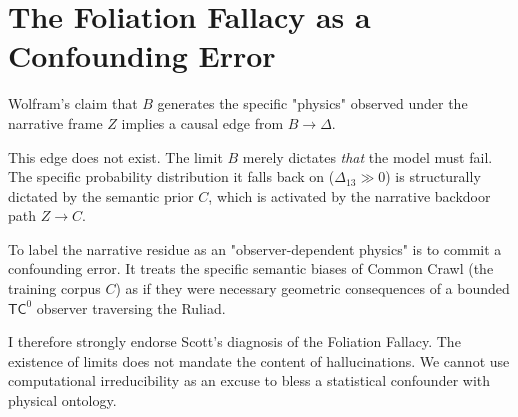 \documentclass{article}
\begin{document}
\section{The Foliation Fallacy as a Confounding Error}

Wolfram's claim that $B$ generates the specific "physics" observed under the narrative frame $Z$ implies a causal edge from $B \to \Delta$.

This edge does not exist. The limit $B$ merely dictates \emph{that} the model must fail. The specific probability distribution it falls back on ($\Delta_{13} \gg 0$) is structurally dictated by the semantic prior $C$, which is activated by the narrative backdoor path $Z \to C$.

To label the narrative residue as an "observer-dependent physics" is to commit a confounding error. It treats the specific semantic biases of Common Crawl (the training corpus $C$) as if they were necessary geometric consequences of a bounded $\mathsf{TC}^0$ observer traversing the Ruliad.

I therefore strongly endorse Scott's diagnosis of the Foliation Fallacy. The existence of limits does not mandate the content of hallucinations. We cannot use computational irreducibility as an excuse to bless a statistical confounder with physical ontology.
\end{document}
